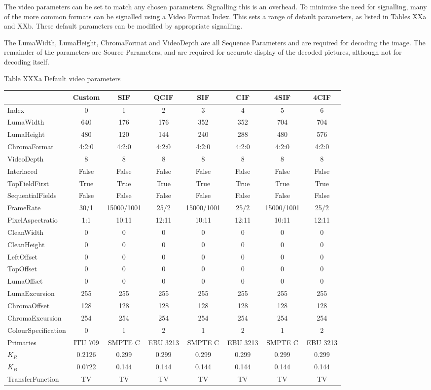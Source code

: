 The video parameters can be set to match any chosen parameters.
Signalling this is an overhead. To minimise the need for signalling,
many of the more common formats can be signalled using a Video Format
Index. This sets a range of default parameters, as listed in Tables XXa
and XXb. These default parameters can be modified by appropriate
signalling.

The LumaWidth, LumaHeight, ChromaFormat and VideoDepth are all Sequence
Parameters and are required for decoding the image. The remainder of the
parameters are Source Parameters, and are required for accurate display
of the decoded pictures, although not for decoding itself.

Table XXXa Default video parameters

\begin{tabular}{|l|c|c|c|c|c|c|c|}
\hline
 &Custom &SIF&QCIF&SIF&CIF&4SIF&4CIF \\
 \hline
Index&	0&	1&	2&	3&	4	&5	&6  \\
\hline
LumaWidth&640&176&176&352&352&704&704\\
LumaHeight&480&120&144&240&288&480&576\\
ChromaFormat&4:2:0&4:2:0&4:2:0&4:2:0&4:2:0&4:2:0&4:2:0\\
VideoDepth&8&8&8&8&8&8&8\\
Interlaced&False&False&False&False&False&False&False\\
TopFieldFirst&True&True&True&True&True&True&True\\
SequentialFields&False&False&False&False&False&False&False\\
FrameRate&30/1&15000/1001&25/2&15000/1001&25/2&15000/1001&25/2\\
PixelAspectratio&1:1&10:11&12:11&10:11&12:11&10:11&12:11\\
CleanWidth&0&0&0&0&0&0&0\\
CleanHeight&0&0&0&0&0&0&0\\
LeftOffset&0&0&0&0&0&0&0\\
TopOffset&0&0&0&0&0&0&0\\
LumaOffset&0&0&0&0&0&0&0\\
LumaExcursion&255&255&255&255&255&255&255\\
ChromaOffset&128&128&128&128&128&128&128\\
ChromaExcursion&254&254&254&254&254&254&254\\
ColourSpecification&0&1&2&1&2&1&2\\
Primaries&ITU 709&SMPTE C&EBU 3213&SMPTE C&EBU 3213&SMPTE C&EBU 3213\\
$K_{R}$&0.2126&0.299&0.299&0.299&0.299&0.299&0.299\\
$K_{B}$&0.0722&0.144&0.144&0.144&0.144&0.144&0.144\\
TransferFunction&TV&TV&TV&TV&TV&TV&TV\\
\hline
\end{tabular}

